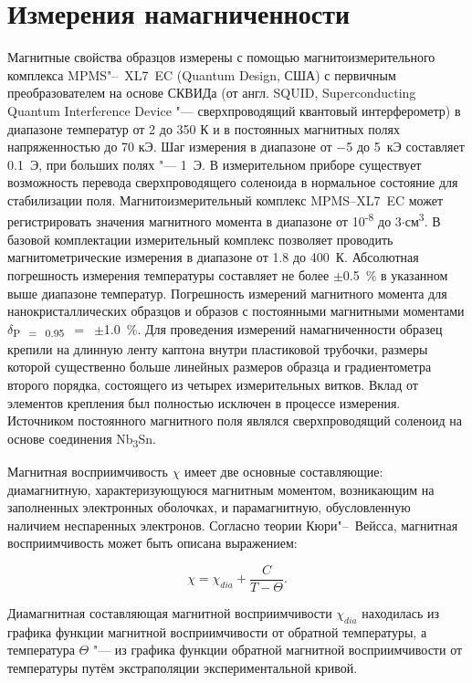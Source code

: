 \newpage
\section{Измерения намагниченности} \label{sect2_6}
Магнитные свойства образцов измерены с
помощью магнитоизмерительного комплекса
MPMS"--~XL7~EC (Quantum Design, США) с первичным преобразователем на основе СКВИДа (от англ. SQUID, Superconducting Quantum Interference Device "--- сверхпроводящий квантовый интерферометр) в диапазоне температур от 2 до 350 К и в постоянных магнитных полях напряженностью до 70 кЭ. Шаг измерения в диапазоне от $-$5 до 5~кЭ составляет 0.1~Э, при больших полях "--- 1~Э. В измерительном приборе существует возможность перевода сверхпроводящего соленоида в нормальное состояние для стабилизации поля. 
Магнитоизмерительный комплекс MPMS--XL7~EC может регистрировать значения магнитного момента в диапазоне от 10\textsuperscript{-8} до 3$\cdot$см\textsuperscript{3}. 
В базовой комплектации измерительный комплекс позволяет проводить магнитометрические измерения в диапазоне от 1.8 до 400~К. 
Абсолютная погрешность измерения температуры составляет не более $\pm$0.5~\% в указанном выше диапазоне температур. 
Погрешность измерений магнитного момента для нанокристаллических образцов и образов с постоянными магнитными моментами $\delta$\textsubscript{P~$=$~0.95}~$=$~$\pm$1.0~\%.
Для проведения измерений намагниченности образец крепили на длинную
ленту каптона внутри пластиковой трубочки, размеры которой существенно больше линейных размеров образца и градиентометра второго порядка,
состоящего из четырех измерительных витков.
Вклад от элементов крепления был полностью исключен в процессе измерения. Источником постоянного магнитного поля являлся сверхпроводящий
соленоид на основе соединения Nb\textsubscript{3}Sn.


Магнитная восприимчивость $\chi$ имеет две основные составляющие: диамагнитную, характеризующуюся магнитным моментом, возникающим на заполненных электронных оболочках, и парамагнитную, обусловленную наличием неспаренных электронов. Согласно теории Кюри"--~Вейсса, магнитная
восприимчивость может быть описана выражением:

\begin{equation}
  \label{eq:equation2.1}
  \chi = \chi_{dia}+\frac{C}{T - \Theta}.
\end{equation}

Диамагнитная составляющая магнитной восприимчивости $\chi_{dia}$ находилась из графика функции
магнитной восприимчивости от обратной температуры, а температура $\Theta$ "--- из графика функции обратной магнитной восприимчивости от
температуры путём экстраполяции экспериментальной кривой.

